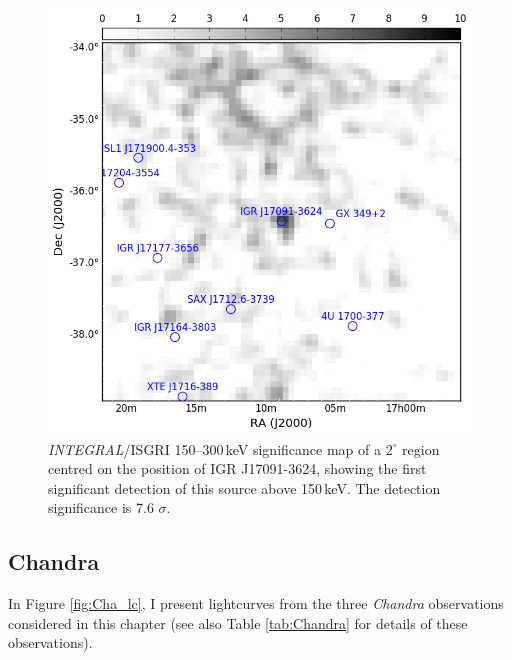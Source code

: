 \begin{figure}
    \includegraphics[width=0.7\columnwidth, trim = 0.6cm 0 3.9cm 0]{images/sigmap.png}
    \captionsetup{singlelinecheck=off}
    \caption[\textit{INTEGRAL}/ISGRI 150--300\,keV significance map of a $2^\circ$ region centred on the position of IGR J17091-3624.]{\textit{INTEGRAL}/ISGRI 150--300\,keV significance map of a $2^\circ$ region centred on the position of IGR J17091-3624, showing the first significant detection of this source above 150\,keV.  The detection significance is 7.6 $\sigma$.}
   \label{fig:sigmap}
\end{figure}

\subsection{Chandra}

\par In Figure \ref{fig:Cha_lc}, I present lightcurves from the three \textit{Chandra} observations considered in this chapter (see also Table \ref{tab:Chandra} for details of these observations).

